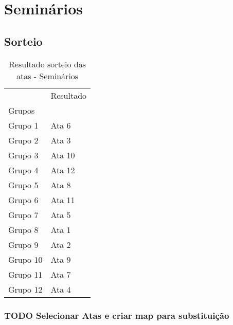 \documentclass[11pt]{article}
\begin{document}
\section{Seminários}
\label{sec:orgc3ebe50}
\subsection{Sorteio}
\label{sec:org7d71d1a}
\begin{table}
\centering
\caption{Resultado sorteio das atas - Seminários}
\begin{tabular}{ll}
\toprule
{} & Resultado \\
Grupos   &           \\
\midrule
Grupo 1  &     Ata 6 \\
Grupo 2  &     Ata 3 \\
Grupo 3  &    Ata 10 \\
Grupo 4  &    Ata 12 \\
Grupo 5  &     Ata 8 \\
Grupo 6  &    Ata 11 \\
Grupo 7  &     Ata 5 \\
Grupo 8  &     Ata 1 \\
Grupo 9  &     Ata 2 \\
Grupo 10 &     Ata 9 \\
Grupo 11 &     Ata 7 \\
Grupo 12 &     Ata 4 \\
\bottomrule
\end{tabular}
\end{table}

\subsubsection{{\bfseries\sffamily TODO} Selecionar Atas e criar map para substituição}
\label{sec:org0cd55a7}
\end{document}

